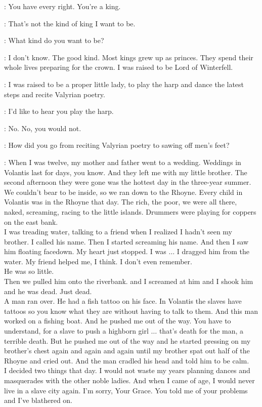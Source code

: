\TALISA: You have every right. You're a king. 

\ROBB: That's not the kind of king I want to be. 

\TALISA: What kind do you want to be? 

\ROBB: I don't know. The good kind. Most kings grew up as princes. They spend their whole lives preparing for the crown. I was raised to be Lord of Winterfell. 

\TALISA: I was raised to be a proper little lady, to play the harp and dance the latest steps and recite Valyrian poetry. 

\ROBB: I'd like to hear you play the harp. 

\TALISA: No. No, you would not. 

\ROBB: How did you go from reciting Valyrian poetry to sawing off men's feet? 

\TALISA: When I was twelve, my mother and father went to a wedding. Weddings in Volantis last for days, you know. And they left me with my little brother. The second afternoon they were gone was the hottest day in the three-year summer. We couldn't bear to be inside, so we ran down to the Rhoyne. Every child in Volantis was in the Rhoyne that day. The rich, the poor, we were all there, naked, screaming, racing to the little islands. Drummers were playing for coppers on the east bank.\\
I was treading water, talking to a friend when I realized I hadn't seen my brother. I called his name. Then I started screaming his name. And then I saw him floating facedown. My heart just stopped. I was $\ldots$ I dragged him from the water. My friend helped me, I think. I don't even remember.\\
He was so little.\\
Then we pulled him onto the riverbank. and I screamed at him and I shook him and he was dead. Just dead.\\
A man ran over. He had a fish tattoo on his face. In Volantis the slaves have tattoos so you know what they are without having to talk to them. And this man worked on a fishing boat. And he pushed me out of the way. You have to understand, for a slave to push a highborn girl $\ldots$ that's death for the man, a terrible death. But he pushed me out of the way and he started pressing on my brother's chest again and again and again until my brother spat out half of the Rhoyne and cried out. And the man cradled his head and told him to be calm.\\
I decided two things that day. I would not waste my years planning dances and masquerades with the other noble ladies. And when I came of age, I would never live in a slave city again.  I'm sorry, Your Grace. You told me of your problems and I've blathered on. 

